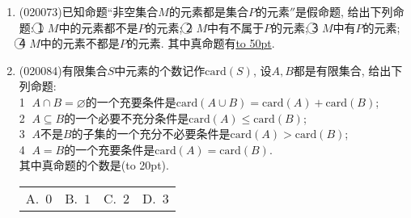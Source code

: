 \documentclass[10pt,a4paper]{article}
\newcommand{\blank}[1]{\underline{\hbox to #1pt{}}}
\newcommand{\bracket}[1]{(\hbox to #1pt{})}
\newcommand{\fourch}[4]{\par\begin{tabular}{p{.23\textwidth}p{.23\textwidth}p{.23\textwidth}p{.23\textwidth}}
A.~#1 &B.~#2& C.~#3& D.~#4
\end{tabular}}
\begin{document}
\begin{enumerate}[1.]
(16) 空集是任何集合的真子集;\blank{50};\\
(17) 若$x\in \mathbf{R}$, 则方程$x^2-x+1=0$不成立;\blank{50};\\
(18) 若$A\cap B\ne \varnothing$, $B\subset C$, 则$A\cap C\ne \varnothing$;\blank{50};\\
(19) 存在一个三角形, 它的任意两边的平方和小于第三边的平方;\blank{50};\\
(20) 对于任意一个三角形, 存在一组两边的平方和不等于第三边的平方;\blank{50}.
\item {\tiny (020073)}已知命题``非空集合$M$的元素都是集合$P$的元素$''$是假命题, 给出下列命题: \textcircled{1} $M$中的元素都不是$P$的元素; \textcircled{2} $M$中有不属于$P$的元素; \textcircled{3} $M$中有$P$的元素; \textcircled{4} $M$中的元素不都是$P$的元素. 其中真命题有\blank{50}.
\item {\tiny (020084)}有限集合$S$中元素的个数记作$\mathrm{card}(S)$, 设$A,B$都是有限集合, 给出下列命题:\\
\textcircled{1} $A\cap B=\varnothing$的一个充要条件是$\mathrm{card}(A\cup B)=\mathrm{card}(A)+\mathrm{card}(B)$;\\
\textcircled{2} $A\subseteq B$的一个必要不充分条件是$\mathrm{card}(A)\le \mathrm{card}(B)$; \\
\textcircled{3} $A$不是$B$的子集的一个充分不必要条件是$\mathrm{card}(A)>\mathrm{card}(B)$;\\ 
\textcircled{4} $A=B$的一个充要条件是$\mathrm{card}(A)=\mathrm{card}(B)$.\\ 
其中真命题的个数是\bracket{20}.
\fourch{$0$}{$1$}{$2$}{$3$}
\end{enumerate}
\end{document}

